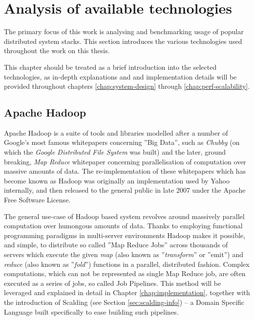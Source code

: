 \chapter{Analysis of available technologies}
\label{cha:existing-and-selected-tech}

The primary focus of this work is analysing and benchmarking usage of popular distributed system stacks. 
This section introduces the various technologies used throughout the work on this thesis.

This chapter should be treated as a brief introduction into the selected technologies, as in-depth explanations and and implementation details will be provided throughout chapters \ref{chap:system-design} through \ref{chap:perf-scalability}.

\section{Apache Hadoop}
\label{sec:hadoop}

Apache Hadoop is a suite of tools and libraries modelled after a number of Google's most famous whitepapers concerning ''Big Data'', such as \textit{Chubby} \cite{chubby} (on which the \textit{Google Distributed File System} \cite{gfs} was built) and the later, ground breaking, \textit{Map Reduce} \cite{map-reduce} whitepaper concerning parallelisation of computation over massive amounts of data.
The re-implementation of these whitepapers which has become known as Hadoop was originally an implementation used by Yahoo \cite{yahoo} internally, and then released to the general public in late 2007 under the Apache Free Software License.

The general use-case of Hadoop based system revolves around massively parallel computation over humongous amounts of data. Thanks to employing functional programming paradigms in multi-server environments Hadoop makes it possible, and simple, to distribute so called ''Map Reduce Jobs'' across thousands of servers which execute the given \textit{map} (also known as ''\textit{transform}'' or ''emit'') and \textit{reduce} (also known as ''\textit{fold}'') functions in a parallel, distributed fashion. Complex computations, which can not be represented as single Map Reduce job, are often executed as a series of jobs, so called Job Pipelines. This method will be leveraged and explained in detail in Chapter \ref{chap:implementation}, together with the introduction of Scalding (see Section \ref{sec:scalding-info}) -- a Domain Specific Language built specifically to ease building such pipelines.

